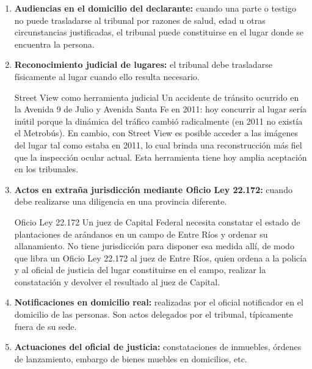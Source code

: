 \documentclass[12pt,oneside]{book}
\begin{document}
\begin{enumerate}[label=\alph*)]
    \item \textbf{Audiencias en el domicilio del declarante:} cuando una parte o testigo no puede trasladarse al tribunal por razones de salud, edad u otras circunstancias justificadas, el tribunal puede constituirse en el lugar donde se encuentra la persona.

    \item \textbf{Reconocimiento judicial de lugares:} el tribunal debe trasladarse físicamente al lugar cuando ello resulta necesario.

    \begin{example}{Street View como herramienta judicial}
    Un accidente de tránsito ocurrido en la Avenida 9 de Julio y Avenida Santa Fe en 2011: hoy concurrir al lugar sería inútil porque la dinámica del tráfico cambió radicalmente (en 2011 no existía el Metrobús). En cambio, con Street View es posible acceder a las imágenes del lugar tal como estaba en 2011, lo cual brinda una reconstrucción más fiel que la inspección ocular actual. Esta herramienta tiene hoy amplia aceptación en los tribunales.
    \end{example}

    \item \textbf{Actos en extraña jurisdicción mediante Oficio Ley 22.172:} cuando debe realizarse una diligencia en una provincia diferente.

    \begin{example}{Oficio Ley 22.172}
    Un juez de Capital Federal necesita constatar el estado de plantaciones de arándanos en un campo de Entre Ríos y ordenar su allanamiento. No tiene jurisdicción para disponer esa medida allí, de modo que libra un Oficio Ley 22.172 al juez de Entre Ríos, quien ordena a la policía y al oficial de justicia del lugar constituirse en el campo, realizar la constatación y devolver el resultado al juez de Capital.
    \end{example}

    \item \textbf{Notificaciones en domicilio real:} realizadas por el oficial notificador en el domicilio de las personas. Son actos delegados por el tribunal, típicamente fuera de su sede.

    \item \textbf{Actuaciones del oficial de justicia:} constataciones de inmuebles, órdenes de lanzamiento, embargo de bienes muebles en domicilios, etc.
\end{enumerate}
\end{document}
